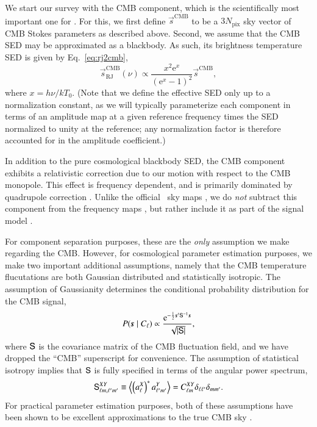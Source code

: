 \documentclass[onecolumn]{aa}
\newcommand{\s}[0]{\vec{s}}
\renewcommand{\S}[0]{\tens{S}}
\newcommand{\e}{\mathrm e}
\begin{document}
We start our survey with the CMB component, which is the
scientifically most important one for \Planck. For this, we first
define $\s^{\mathrm{CMB}}$ to be a $3N_{\mathrm{pix}}$ sky vector of
CMB Stokes parameters as described above. Second, we assume that the CMB
SED may be approximated as a blackbody. As such, its brightness
temperature SED is given by Eq.~\eqref{eq:rj2cmb}, 
\begin{equation}
  \s_{\mathrm{RJ}}^{\mathrm{CMB}}(\nu) \propto
  \frac{x^2\e^x}{\left(\e^{x}-1\right)^2} \s^{\mathrm{CMB}},
\end{equation}
where $x=h\nu/kT_0$. (Note that we define the effective SED only up to
a normalization constant, as we will typically parameterize each
component in terms of an amplitude map at a given reference frequency
times the SED normalized to unity at the reference; any normalization
factor is therefore accounted for in the amplitude coefficient.)

In addition to the pure cosmological blackbody SED, the CMB component
exhibits a relativistic correction due to our motion with respect to
the CMB monopole. This effect is frequency dependent, and is primarily
dominated by quadrupole correction \citep{Notari:2015}. Unlike the
official \Planck\ sky maps \citep{planck2016-l02,npipe}, we do
\emph{not} subtract this component from the frequency maps
\citep{bp10}, but rather include it as part of the
signal model \citep{bp13}.

For component separation purposes, these are the \emph{only} assumption
we make regarding the CMB. However, for cosmological parameter
estimation purposes, we make two important additional assumptions,
namely that the CMB temperature flucutations are both Gaussian
distributed and statistically isotropic. The
assumption of Gaussianity determines the conditional probability
distribution for the CMB signal,
\begin{equation}
  P(\s\mid C_{\ell}) \propto \frac{\e^{-\frac{1}{2}\s^t
      \S^{-1} \s}}{\sqrt{|\S|}},
  \label{eq:Pcmb}
\end{equation}
where $\S$ is the covariance matrix of the CMB fluctuation field, and
we have dropped the ``CMB'' superscript for convenience. The assumption
of statistical isotropy implies that $\S$ is fully specified in terms
of the angular power spectrum,
\begin{equation}
  \S^{XY}_{\ell m, \ell' m'} \equiv \left<\left(a^X_{\ell}\right)^*
  a^{Y}_{\ell' m'}\right> = C^{XY}_{\ell m} \delta_{\ell
    \ell'}\delta_{m m'}.
\end{equation}
For practical parameter estimation purposes, both of these assumptions
have been shown to be excellent approximations to the true CMB sky
\citep[see, e.g.,][and references
  therein]{planck2016-l07,planck2016-l09}.
\end{document}
